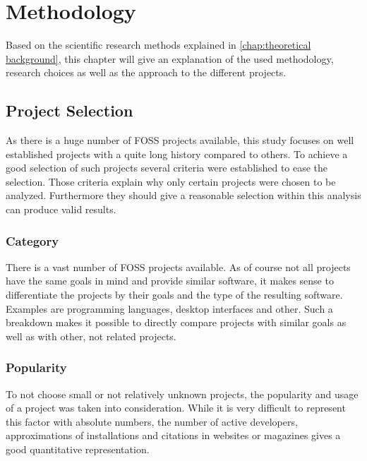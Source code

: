 \chapter{Methodology} %
\label{chap:methodology}

Based on the scientific research methods explained in \autoref{chap:theoretical
background}, this chapter will give an explanation of the used methodology,
research choices as well as the approach to the different projects.

\section{Project Selection} %

As there is a huge number of \ac{FOSS} projects available, this study focuses
on well established projects with a quite long history compared to others. To
achieve a good selection of such projects several criteria were established to
ease the selection. Those criteria explain why only certain projects were
chosen to be analyzed. Furthermore they should give a reasonable selection
within this analysis can produce valid results.

\subsection{Category} %

There is a vast number of \ac{FOSS} projects available. As of course not all
projects have the same goals in mind and provide similar software, it makes
sense to differentiate the projects by their goals and the type of the
resulting software. Examples are programming languages, desktop interfaces and
other. Such a breakdown makes it possible to directly compare projects with
similar goals as well as with other, not related projects.


\subsection{Popularity} %

To not choose small or not relatively unknown projects, the popularity and
usage of a project was taken into consideration. While it is very difficult to
represent this factor with absolute numbers, the number of active developers,
approximations of installations and citations in websites or magazines gives a
good quantitative representation.


